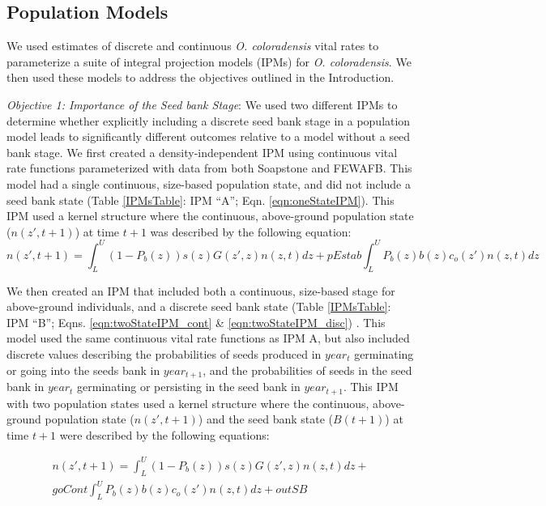 \documentclass[12pt, letterpaper]{article}
\begin{document}
\subsection{Population Models}
We used estimates of discrete and continuous \textit{O. coloradensis} vital rates to parameterize a suite of integral projection models (IPMs) for \textit{O. coloradensis}. We then used these models to address the objectives outlined in the Introduction.

\textit{Objective 1: Importance of the Seed bank Stage}: We used two different IPMs to determine whether explicitly including a discrete seed bank stage in a population model leads to significantly different outcomes relative to a model without a seed bank stage. We first created a density-independent IPM using continuous vital rate functions parameterized with data from both Soapstone and FEWAFB. This model had a single continuous, size-based population state, and did not include a seed bank state (Table \ref{IPMsTable}: IPM “A”; Eqn. \ref{eqn:oneStateIPM}). This IPM used a kernel structure where the continuous, above-ground population state ($n(z', t+1)$) at time $t+1$ was described by the following equation:  
\begin{equation}\label{eqn:oneStateIPM} 
n(z', t+1) = \int_{L}^{U}(1-P_b(z))s(z)G(z',z)n(z,t)dz + pEstab\int_{L}^{U}P_b(z)b(z)c_o(z')n(z,t)dz
\end{equation}

We then created an IPM that included both a continuous, size-based stage for above-ground individuals, and a discrete seed bank state (Table \ref{IPMsTable}: IPM “B”; Eqns. \ref{eqn:twoStateIPM_cont} \& \ref{eqn:twoStateIPM_disc}) \cite{Ellner2006IntegralDemography, Rees2006, Paniw2017}. This model used the same continuous vital rate functions as IPM A, but also included discrete values describing the probabilities of seeds produced in $year_{t}$ germinating or going into the seeds bank in $year_{t+1}$, and the probabilities of seeds in the seed bank in $year_{t}$ germinating or persisting in the seed bank in $year_{t+1}$. This IPM with two population states used a kernel structure where the continuous, above-ground population state ($n(z',t+1)$) and the seed bank state ($B(t+1)$) at time $t+1$ were described by the following equations: 

\begin{equation}
\label{eqn:twoStateIPM_cont}
\begin{split}
n(z', t+1) = \int_{L}^{U}(1-P_b(z))s(z)G(z',z)n(z,t)dz + \\ goCont\int_{L}^{U}P_b(z)b(z)c_o(z')n(z,t)dz + outSB 
\end{split}
\end{equation}
\end{document}
